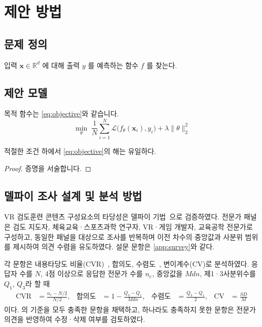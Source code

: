 \chapter{제안 방법}\label{ch:method}

\section{문제 정의}
\begin{definition}[문제]\label{def:problem}
  입력 $\mathbf{x} \in \mathbb{R}^d$ 에 대해 출력 $y$ 를 예측하는 함수 $f$ 를 찾는다.
\end{definition}

\section{제안 모델}
목적 함수는 \cref{eq:objective}와 같습니다.
\begin{equation}\label{eq:objective}
  \min_{\theta} \; \frac{1}{N}\sum_{i=1}^{N} \mathcal{L}\bigl(f_\theta(\mathbf{x}_i), y_i\bigr) + \lambda \lVert \theta \rVert_2^2
\end{equation}

\begin{theorem}\label{thm:main}
  적절한 조건 하에서 \cref{eq:objective}의 해는 유일하다.
\end{theorem}
\begin{proof}
  증명을 서술합니다.
\end{proof}

\section{델파이 조사 설계 및 분석 방법}\label{sec:delphi}

VR 검도훈련 콘텐츠 구성요소의 타당성은 델파이 기법~\cite{dalkey1963delphi}으로 검증하였다.
전문가 패널은 검도 지도자, 체육교육·스포츠과학 연구자, VR·게임 개발자, 교육공학 전문가로 구성하고,
동일한 패널을 대상으로 조사를 반복하며 이전 차수의 중앙값과 사분위 범위를 제시하여 의견 수렴을 유도하였다.
설문 문항은 \cref{app:survey}와 같다.

각 문항은 내용타당도 비율(CVR)~\cite{lawshe1975cvr}, 합의도, 수렴도~\cite{lee2001delphi}, 변이계수(CV)로 분석하였다.
응답자 수를 $N$, 4점 이상으로 응답한 전문가 수를 $n_e$, 중앙값을 $Mdn$, 제1·3사분위수를 $Q_1$, $Q_3$라 할 때
\begin{align}
  \mathrm{CVR} &= \frac{n_e - N/2}{N/2}, &
  \text{합의도} &= 1 - \frac{Q_3 - Q_1}{Mdn}, &
  \text{수렴도} &= \frac{Q_3 - Q_1}{2}, &
  \mathrm{CV} &= \frac{SD}{M}
  \label{eq:delphi}
\end{align}
이다. 의 기준을 모두 충족한 문항을 채택하고,
하나라도 충족하지 못한 문항은 전문가 의견을 반영하여 수정·삭제 여부를 검토하였다.

